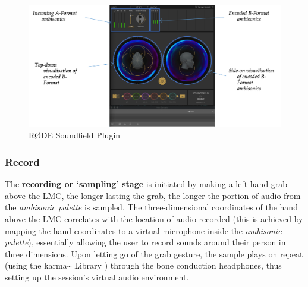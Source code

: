 \begin{figure}
    \centering
    \includegraphics[width=\linewidth]{figures/05-area/areatechnical_rode.png}
    \caption{RØDE Soundfield Plugin}
    \label{fig: areatechnicalrode}
\end{figure}

\subsubsection{Record}                          \label{sec: area-system-software-record}
The \textbf{recording or ‘sampling’ stage} is initiated by making a left-hand grab above the LMC, the longer lasting the grab, the longer the portion of audio from the \textit{ambisonic palette} is sampled. The three-dimensional coordinates of the hand above the LMC correlates with the location of audio recorded (this is achieved by mapping the hand coordinates to a virtual microphone inside the \textit{ambisonic palette}), essentially allowing the user to record sounds around their person in three dimensions. Upon letting go of the grab gesture, the sample plays on repeat (using the karma\textasciitilde{} Library \citep{constanzo2015}) through the bone conduction headphones, thus setting up the session’s virtual audio environment.

